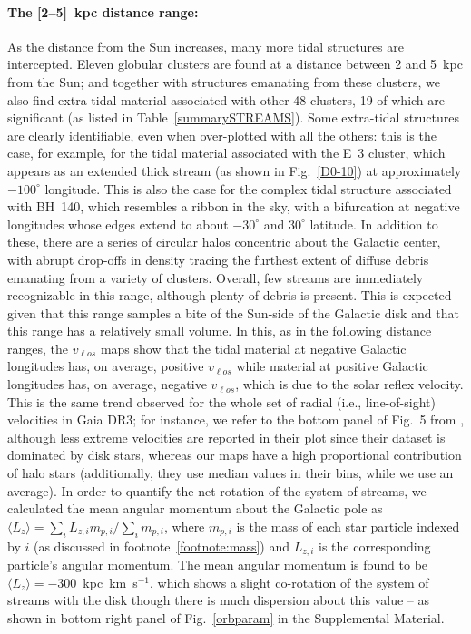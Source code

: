     \paragraph{The [2--5]~kpc distance range: }
    As the distance from the Sun increases, many more tidal structures are intercepted. Eleven globular clusters are found at a distance between 2 and 5~kpc from the Sun; and together with structures emanating from these clusters, we also find extra-tidal material associated with other 48 clusters, 19 of which are significant (as listed in Table~\ref{summarySTREAMS}). Some extra-tidal structures are clearly identifiable, even when over-plotted with all the others: this is the case, for example, for the tidal material associated with the E~3 cluster, which appears as an extended thick stream (as shown in Fig.~\ref{D0-10}) at approximately $-100^{\circ}$ longitude. This is also the case for the complex tidal structure associated with BH~140, which resembles a ribbon in the sky, with a bifurcation at negative longitudes whose edges extend to about $-30^\circ$ and $30^\circ$ latitude. In addition to these, there are a series of circular halos concentric about the Galactic center, with abrupt drop-offs in density tracing the furthest extent of diffuse debris emanating from a variety of clusters. Overall, few streams are immediately recognizable in this range, although plenty of debris is present. This is expected given that this range samples a bite of the Sun-side of the Galactic disk and that this range has a relatively small volume. In this, as in the following distance ranges, the $v_{\ell os}$ maps show that the tidal material at negative Galactic longitudes has, on average, positive $v_{\ell os}$ while material at positive Galactic longitudes has, on average, negative $v_{\ell os}$, which is due to the solar reflex velocity. This is the same trend observed for the whole set of radial (i.e., line-of-sight) velocities in Gaia DR3; for instance, we refer to the bottom panel of Fig.~5 from \citet{2023A&A...674A...5K}, although less extreme velocities are reported in their plot since their dataset is dominated by disk stars, whereas our maps have a high proportional contribution of halo stars (additionally, they use median values in their bins, while we use an average). In order to quantify the net rotation of the system of streams, we calculated the mean angular momentum about the Galactic pole as $\langle L_z \rangle =\sum_i L_{z,i} m_{p,i} / \sum_i m_{p,i} $, where $m_{p,i}$ is the mass of each star particle indexed by $i$ (as discussed in footnote~\ref{footnote:mass}) and $L_{z,i}$ is the corresponding particle's angular momentum. The mean angular momentum is found to be $\langle L_z \rangle =-300$~kpc~km~s$^{-1}$, which shows a slight co-rotation of the system of streams with the disk though there is much dispersion about this value -- as shown in bottom right panel of Fig.~\ref{orbparam} in the Supplemental Material.


